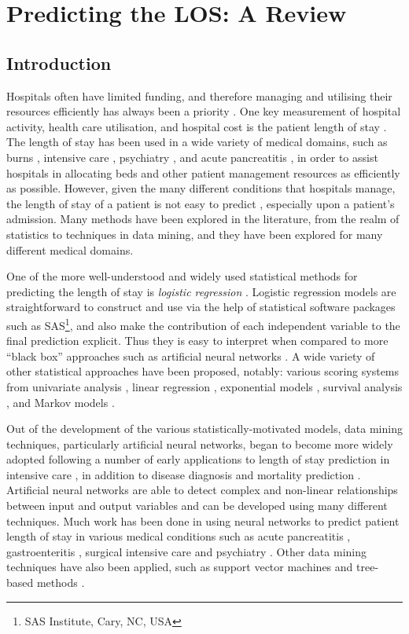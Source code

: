 \chapter{Predicting the LOS: A Review} \label{chap:litreview}

\section{Introduction}
Hospitals often have limited funding, and therefore managing and utilising
their resources efficiently has always been a priority \cite{Walczak2003}.
One key measurement of hospital activity, health care utilisation, and hospital
cost is the patient length of stay \citep{Omachonu2004,Ng2006}. The length of
stay has been used in a wide variety of medical domains, such as burns
 \citep{Yang2010}, intensive
care \citep{Tu1993,Harper2005,Perez2006,Dybowski1996},
psychiatry \citep{Lowell1997}, and acute pancreatitis \citep{Pofahl1998}, in
order to assist hospitals in allocating beds and other patient management
resources as efficiently as possible. However, given the many different
conditions that hospitals manage, the length of stay of a patient is
not easy to predict \citep{Walczak2003}, especially upon a patient's admission.
Many methods have been explored in the literature, from the realm of statistics
to techniques in data mining, and they have been explored for many different
medical domains.

One of the more well-understood and widely used statistical methods for
predicting the length of stay is \textit{logistic regression} \citep{Tu1996}.
Logistic regression models are straightforward to construct and use via the
help of statistical software packages such as
SAS\footnote{SAS Institute, Cary, NC, USA}, and
also make the contribution of each independent variable to the final
prediction explicit. Thus they is easy to interpret when compared to more
``black box'' approaches such as artificial neural networks \citep{Adams2012}.
A wide variety of other statistical approaches have been proposed, notably:
various scoring systems from univariate analysis \citep{Adams2012,Lavoie2005},
linear regression \citep{Yang2010}, exponential models \citep{Clark2007},
survival analysis \citep{Vasilakis2005}, and Markov
models \citep{Perez2006,Jain1989,Kapadia2000}.

Out of the development of the various statistically-motivated models, data
mining techniques, particularly artificial neural networks,
began to become more widely adopted following a number of
early applications to length of stay prediction in intensive
care \citep{Tu1993,Dybowski1996}, in addition to disease diagnosis and mortality
prediction \citep{Silva2006}. Artificial neural networks are able to detect
complex and non-linear relationships between input and output variables and can
be developed using many different techniques. Much work has been done in using
neural networks to predict patient length of stay in various medical conditions
such as acute pancreatitis \citep{Walczak2003}, gastroenteritis \citep{Ng2006},
surgical intensive care \citep{Buchman1994,Tu1993} and
psychiatry \citep{Lowell1997}. Other data mining techniques have also been
applied, such as support vector machines and tree-based
methods \citep{Harper2005}.

